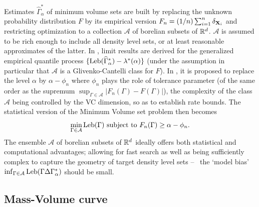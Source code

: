 Estimates $\widehat{\Gamma}^*_{\alpha}$ of minimum volume sets are built by replacing the unknown probability distribution $F$ by its empirical version $F_n=(1/n)\sum_{i=1}^n\delta_{\mathbf X_i}$ and restricting optimization to a collection $\mathcal{A}$ of borelian subsets of $\mathbb{R}^d$.  $\mathcal{A}$ is  assumed to be rich enough to include all density level sets, or at least reasonable approximates of the latter. 
In \cite{Polonik97}, limit results are derived for the generalized empirical quantile process $\{\text{Leb}(\widehat{\Gamma}^*_{\alpha})-\lambda^*(\alpha)\}$ (under the assumption in particular that $\mathcal{A}$ is a Glivenko-Cantelli class for $F$). In \cite{Scott2006}, it is proposed to replace the level $\alpha$ by $\alpha-\phi_n$ where $\phi_n$ plays the role of tolerance parameter (of the same order as the supremum $\sup_{\Gamma\in \mathcal{A}}\vert F_n(\Gamma)-F(\Gamma) \vert$), the complexity of the class $\mathcal{A}$ being controlled by the {\sc VC} dimension, so as to establish rate bounds. The statistical version of the Minimum Volume set problem then becomes
$$
\min_{\Gamma \in \mathcal{A}} \text{Leb}(\Gamma) \mbox{ subject to } F_n (\Gamma) \ge \alpha - \phi_n.
$$
The ensemble $\mathcal{A}$ of borelian subsets of $\mathbb{R}^d$ ideally offers both statistical and computational advantages; allowing for fast search as well as being sufficiently complex to capture the geometry of target density level sets -- \ie~the `model bias' $\inf_{\Gamma \in \mathcal{A}} \text{Leb}(\Gamma \Delta \Gamma^*_\alpha )$ should be small.


\subsection{Mass-Volume curve}
\label{resume_fr:mv-curve}

